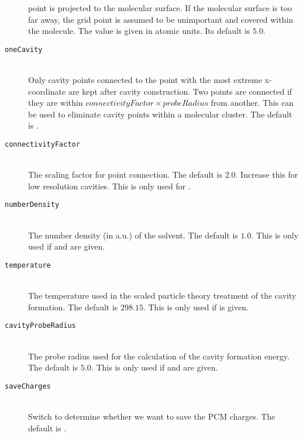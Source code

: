 \begin{description}
    point is projected to the molecular surface. If the molecular surface is too far away, the grid point is 
    assumed to be unimportant and covered within the molecule. The value is given in atomic units. Its default is 
    $5.0$.
    \item [\texttt{oneCavity}]\hfill \\
    Only cavity points connected to the point with the most extreme
    x-coordinate are kept after cavity construction. Two points are connected if they are within
    $connectivityFactor\times probeRadius$ from another. This can be used to eliminate cavity points within a 
    molecular cluster. The default is .
    \item [\texttt{connectivityFactor}]\hfill \\
    The scaling factor for point connection. The default is $2.0$. Increase this for low
    resolution cavities. This is only used for .
    \item [\texttt{numberDensity}]\hfill \\
    The number density (in a.u.) of the solvent. The default is $1.0$. This is only used if 
     and  are given.
    \item [\texttt{temperature}]\hfill \\
    The temperature used in the scaled particle theory treatment of the cavity formation. The
    default is $298.15$. This is only used if  is given.
    \item [\texttt{cavityProbeRadius}]\hfill \\
    The probe radius used for the calculation of the cavity formation energy. The default is $5.0$.
    This is only used if  and  are given. 
    \item [\texttt{saveCharges}]\hfill \\
	Switch to determine whether we want to save the PCM charges. The default is .
 \end{description}


